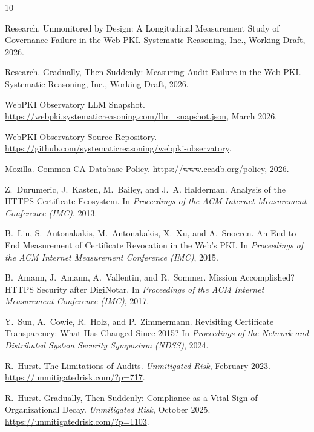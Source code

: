 \documentclass[10pt,twocolumn,letterpaper]{article}
\begin{document}

\begin{thebibliography}{10}

Research.
\newblock Unmonitored by Design: A Longitudinal Measurement Study of
  Governance Failure in the Web PKI.
\newblock Systematic Reasoning, Inc., Working Draft, 2026.

Research.
\newblock Gradually, Then Suddenly: Measuring Audit Failure in the Web PKI.
\newblock Systematic Reasoning, Inc., Working Draft, 2026.

WebPKI Observatory LLM Snapshot.
\newblock \url{https://webpki.systematicreasoning.com/llm_snapshot.json},
  March 2026.

WebPKI Observatory Source Repository.
\newblock \url{https://github.com/systematicreasoning/webpki-observatory}.

Mozilla.
\newblock Common CA Database Policy.
\newblock \url{https://www.ccadb.org/policy}, 2026.

Z.~Durumeric, J.~Kasten, M.~Bailey, and J.~A. Halderman.
\newblock Analysis of the HTTPS Certificate Ecosystem.
\newblock In \textit{Proceedings of the ACM Internet Measurement Conference
  (IMC)}, 2013.

B.~Liu, S.~Antonakakis, M.~Antonakakis, X.~Xu, and A.~Snoeren.
\newblock An End-to-End Measurement of Certificate Revocation in the Web's PKI.
\newblock In \textit{Proceedings of the ACM Internet Measurement Conference
  (IMC)}, 2015.

B.~Amann, J.~Amann, A.~Vallentin, and R.~Sommer.
\newblock Mission Accomplished? HTTPS Security after DigiNotar.
\newblock In \textit{Proceedings of the ACM Internet Measurement Conference
  (IMC)}, 2017.

Y.~Sun, A.~Cowie, R.~Holz, and P.~Zimmermann.
\newblock Revisiting Certificate Transparency: What Has Changed Since 2015?
\newblock In \textit{Proceedings of the Network and Distributed System
  Security Symposium (NDSS)}, 2024.

R.~Hurst.
\newblock The Limitations of Audits.
\newblock \textit{Unmitigated Risk}, February 2023.
\newblock \url{https://unmitigatedrisk.com/?p=717}.

R.~Hurst.
\newblock Gradually, Then Suddenly: Compliance as a Vital Sign of
  Organizational Decay.
\newblock \textit{Unmitigated Risk}, October 2025.
\newblock \url{https://unmitigatedrisk.com/?p=1103}.

\end{thebibliography}
\end{document}
